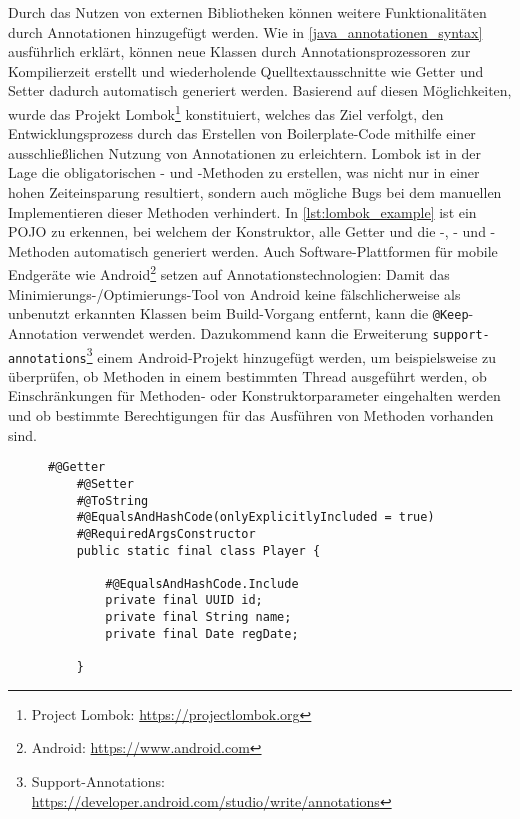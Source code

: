 \noindent Durch das Nutzen von externen Bibliotheken können weitere Funktionalitäten durch Annotationen hinzugefügt werden. Wie in \autoref{java_annotationen_syntax} ausführlich erklärt, können neue Klassen durch Annotationsprozessoren zur Kompilierzeit erstellt und wiederholende Quelltextausschnitte wie Getter und Setter dadurch automatisch generiert werden. Basierend auf diesen Möglichkeiten, wurde das Projekt Lombok\footnote{Project Lombok: \url{https://projectlombok.org}} konstituiert, welches das Ziel verfolgt, den Entwicklungsprozess durch das Erstellen von Boilerplate-Code mithilfe einer ausschließlichen Nutzung von Annotationen zu erleichtern. Lombok ist in der Lage die obligatorischen - und -Methoden zu erstellen, was nicht nur in einer hohen Zeiteinsparung resultiert, sondern auch mögliche Bugs bei dem manuellen Implementieren dieser Methoden verhindert. In \autoref{lst:lombok_example} ist ein POJO zu erkennen, bei welchem der Konstruktor, alle Getter und die -, - und -Methoden automatisch generiert werden. Auch Software-Plattformen für mobile Endgeräte wie Android\footnote{Android: \url{https://www.android.com}} setzen auf Annotationstechnologien: Damit das Minimierungs-/Optimierungs-Tool von Android keine fälschlicherweise als unbenutzt erkannten Klassen beim Build-Vorgang entfernt, kann die \texttt{@Keep}-Annotation verwendet werden. Dazukommend kann die Erweiterung \texttt{support-annotations}\footnote{Support-Annotations: \url{https://developer.android.com/studio/write/annotations}} einem Android-Projekt hinzugefügt werden, um beispielsweise zu überprüfen, ob Methoden in einem bestimmten Thread ausgeführt werden, ob Einschränkungen für Methoden- oder Konstruktorparameter eingehalten werden und ob bestimmte Berechtigungen für das Ausführen von Methoden vorhanden sind.

\begin{figure}[H]
	\begin{lstlisting}[caption=Beispiel -- Lombok POJO, captionpos=b, label=lst:lombok_example]
	#@Getter
	#@Setter
	#@ToString
	#@EqualsAndHashCode(onlyExplicitlyIncluded = true)
	#@RequiredArgsConstructor
	public static final class Player {

		#@EqualsAndHashCode.Include
		private final UUID id;
		private final String name;
		private final Date regDate;

	}
	\end{lstlisting}
\end{figure}

